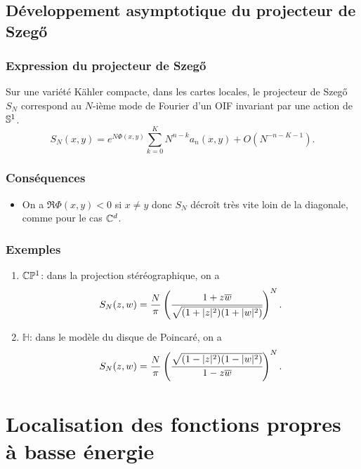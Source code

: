 \documentclass[mathserif]{beamer}
\begin{document}
\subsection{D\'eveloppement asymptotique du projecteur de Szeg\H{o}}
\begin{frame}
  \frametitle{Expression du projecteur de Szeg\H{o}}
  \begin{thm}
    Sur une vari\'et\'e K\"ahler compacte, dans les cartes locales, le
    projecteur de Szeg\H{o} $S_N$ correspond au $N$-ième mode de
    Fourier d'un OIF invariant par une action de $\S^1$.
    \[
      S_N(x,y)=e^{N\Phi(x,y)}\sum_{k=0}^KN^{n-k}a_n(x,y)+O(N^{-n-K-1}).
    \]
  \end{thm}
\end{frame}

\begin{frame}
  \frametitle{Cons\'equences}
\begin{itemize}
  \item 
  On a $\Re\Phi(x,y)<0$ si $x\neq y$ donc $S_N$ d\'ecroît très vite loin
  de la diagonale, comme pour le cas $\C^d$.
  \end{itemize}
  
\end{frame}

\begin{frame}
  \frametitle{Exemples}
  \begin{enumerate}
  \item $\C\mathbb{P}^1$: dans la projection st\'er\'eographique, on a
    \[
      S_N(z,w)=\frac{N}{\pi}\left(\cfrac{1+z\overline{w}}{\sqrt{(1+|z|^2)(1+|w|^2)}}\right)^N.
    \]
    
  \item $\mathbb{H}$: dans le modèle du disque de Poincar\'e, on
    a
    \[
      S_N(z,w)=\frac{N}{\pi}\left(\cfrac{\sqrt{(1-|z|^2)(1-|w|^2)}}{1-z\overline{w}}\right)^N.
    \]
    
  \end{enumerate}
\end{frame}

\section{Localisation des fonctions propres à basse \'energie}
\end{document}
